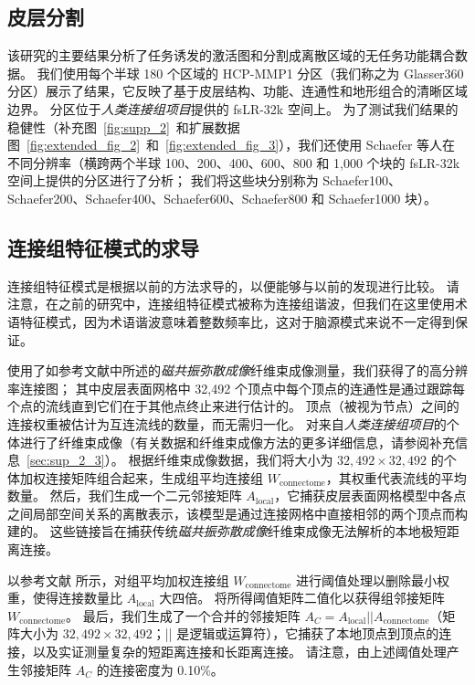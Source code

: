 \documentclass[lang=cn,a4paper,newtx,citestyle=gb7714-2015, bibstyle=gb7714-2015]{elegantpaper}
\begin{document}
\subsection{皮层分割} \label{sec:cortical_parcellations}

该研究的主要结果分析了任务诱发的激活图和分割成离散区域的无任务功能耦合数据。
我们使用每个半球 180 个区域的 HCP-MMP1 分区（我们称之为 Glasser360 分区）展示了结果，它反映了基于皮层结构、功能、连通性和地形组合的清晰区域边界\cite{glasser2016multi}。
分区位于\textit{人类连接组项目}提供的 fsLR-32k 空间上。
为了测试我们结果的稳健性（补充图~\ref{fig:supp_2}~和扩展数据图~\ref{fig:extended_fig_2}~和~\ref{fig:extended_fig_3}），我们还使用 Schaefer 等人\cite{schaefer2018local}在不同分辨率（横跨两个半球 100、200、400、600、800 和 1,000 个块的 fsLR-32k 空间上提供的分区进行了分析；
我们将这些块分别称为 Schaefer100、Schaefer200、Schaefer400、Schaefer600、Schaefer800 和 Schaefer1000 块）。


\subsection{连接组特征模式的求导} \label{sec:connectome_derivation}

连接组特征模式是根据以前的方法\cite{naze2021robustness}求导的，以便能够与以前的发现进行比较。
请注意，在之前的研究中\cite{atasoy2016human,preti2019decoupling,naze2021robustness,rue2021connectome}，连接组特征模式被称为连接组谐波，但我们在这里使用术语特征模式，因为术语谐波意味着整数频率比，这对于脑源模式来说不一定得到保证。


使用了如参考文献\cite{tian2021high}中所述的\textit{磁共振弥散成像}纤维束成像测量，我们获得了的高分辨率连接图；
其中皮层表面网格中 32,492 个顶点中每个顶点的连通性是通过跟踪每个点的流线直到它们在于其他点终止来进行估计的。
顶点（被视为节点）之间的连接权重被估计为互连流线的数量，而无需归一化\cite{tournier2019mrtrix3}。
对来自\textit{人类连接组项目}的个体进行了纤维束成像（有关数据和纤维束成像方法的更多详细信息，请参阅补充信息~\ref{sec:sup_2_3}）。
根据纤维束成像数据，我们将大小为 $ 32,492 \times 32,492 $ 的个体加权连接矩阵组合起来，生成组平均连接组 $ W_{\text{connectome}} $，其权重代表流线的平均数量。
然后，我们生成一个二元邻接矩阵 $ A_{\text{local}} $，它捕获皮层表面网格模型中各点之间局部空间关系的离散表示，该模型是通过连接网格中直接相邻的两个顶点而构建的。
这些链接旨在捕获传统\textit{磁共振弥散成像}纤维束成像无法解析的本地极短距离连接。


以参考文献\cite{naze2021robustness} 所示，对组平均加权连接组 $ W_{\text{connectome}} $ 进行阈值处理以删除最小权重，使得连接数量比 $ A_{\text{local}} $ 大四倍。
将所得阈值矩阵二值化以获得组邻接矩阵 $ W_{\text{connectome}} $。 
最后，我们生成了一个合并的邻接矩阵 $ A_C = A_{\text{local}} || A_{\text{connectome}} $（矩阵大小为 $ 32,492 \times 32,492 $；|| 是逻辑或运算符），它捕获了本地顶点到顶点的连接，以及实证测量复杂的短距离连接和长距离连接。
请注意，由上述阈值处理产生邻接矩阵 $ A_C $ 的连接密度为 0.10\%。
\end{document}
